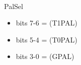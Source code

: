 \\
PalSel
\begin{itemize}
\item bits 7-6 = (T1PAL)
\item bits 5-4 = (T0PAL)
\item bits 3-0 = (GPAL)
\end{itemize}


